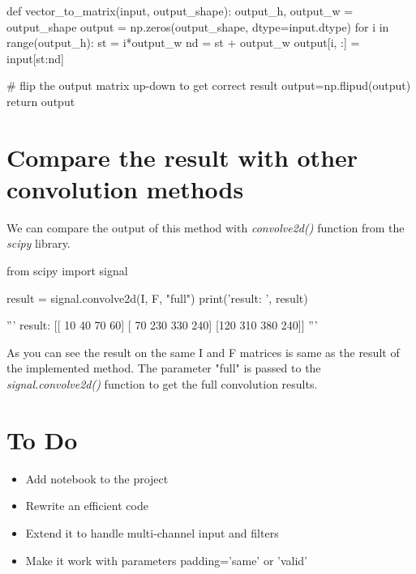 \documentclass[11pt]{article}
\begin{document}
	\vspace{10mm}
	\begin{python}
	def vector_to_matrix(input, output_shape):
	 output_h, output_w = output_shape
	 output = np.zeros(output_shape, dtype=input.dtype)
	 for i in range(output_h):
	  st = i*output_w
	  nd = st + output_w
	  output[i, :] = input[st:nd]
	  
	 # flip the output matrix up-down to get correct result
	 output=np.flipud(output)
	 return output
		
	\end{python}
	\vspace{10mm}
	
	\section{Compare the result with other convolution methods}
	We can compare the output of this method with \textit{convolve2d()} function from the \textit{scipy} library.
	
	\vspace{10mm}
	\begin{python}
	from scipy import signal
	
	result = signal.convolve2d(I, F, "full")
	print('result: \n', result)
	
	
	
	'''
	result: 
	[[ 10  40  70  60]
	[ 70 230 330 240]
	[120 310 380 240]]
	'''
		
	\end{python}
	\vspace{10mm}
	
	As you can see the result on the same I and F matrices is same as the result of the implemented method. The parameter "full" is passed to the \textit{signal.convolve2d()} function to get the full convolution results.
	
	\section{To Do}
	
	\begin{itemize}
		\item Add notebook to the project
		\item Rewrite an efficient code
		\item Extend it to handle multi-channel input and filters
		\item Make it work with parameters padding='same' or 'valid'
	\end{itemize}
	
\end{document}
